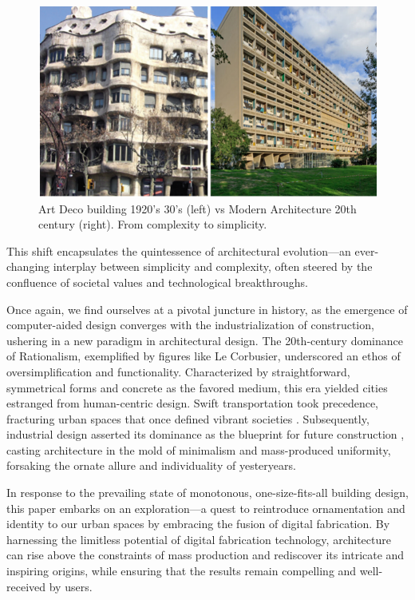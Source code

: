      \begin{figure}[htb]
          \centering
          \includegraphics[width= \linewidth]{Images/ArtdecoVsModernism}
          \caption{Art Deco building 1920's 30's (left) vs Modern Architecture 20th century (right). From complexity to simplicity.}
          \label{fig:ArtDecovsModernism}
        \end{figure}


This shift encapsulates the quintessence of architectural evolution—an ever-changing interplay between simplicity and complexity, often steered by the confluence of societal values and technological breakthroughs.

Once again, we find ourselves at a pivotal juncture in history, as the emergence of computer-aided design converges with the industrialization of construction, ushering in a new paradigm in architectural design. The 20th-century dominance of Rationalism, exemplified by figures like Le Corbusier, underscored an ethos of oversimplification and functionality. Characterized by straightforward, symmetrical forms and concrete as the favored medium, this era yielded cities estranged from human-centric design. Swift transportation took precedence, fracturing urban spaces that once defined vibrant societies \cite{Stacbond2020}. Subsequently, industrial design asserted its dominance as the blueprint for future construction \cite{Economakis2023}, casting architecture in the mold of minimalism and mass-produced uniformity, forsaking the ornate allure and individuality of yesteryears.

In response to the prevailing state of monotonous, one-size-fits-all building design, this paper embarks on an exploration—a quest to reintroduce ornamentation and identity to our urban spaces by embracing the fusion of digital fabrication. By harnessing the limitless potential of digital fabrication technology, architecture can rise above the constraints of mass production and rediscover its intricate and inspiring origins, while ensuring that the results remain compelling and well-received by users.

